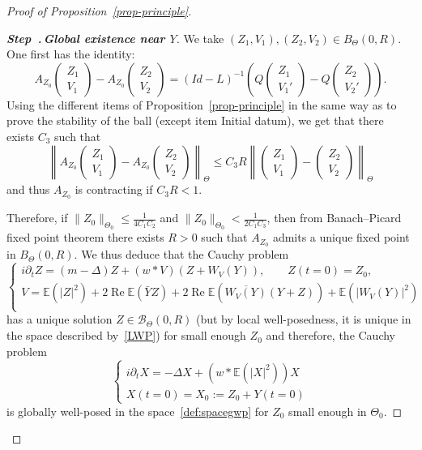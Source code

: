 \documentclass[AHL, Unicode, longabstracts,published]{cedram}
\newcommand{\E}{\mathbb{E}}
\DeclareMathOperator{\Rel}{Re}
\newcommand{\mclB}{\mathcal{B}}
\newcounter{stepcount}
\newenvironment{step}[1]{\refstepcounter{stepcount}\begin{proof}[{\bf{Step~\thestepcount}{.\,\emph{#1}}}]}{\let\qed\relax\end{proof}}
\begin{document}
\begin{proof}[Proof of Proposition~\ref{prop-principle}]
\begin{step}{{Global existence near $Y$}}
We take $(Z_1,V_1),(Z_2,V_2)\in B_\Theta(0,R)$. One first has the identity:
\begin{equation} \label{id:AV1-V2inter}
A_{Z_0}
\begin{pmatrix}
Z_1\\ V_1
\end{pmatrix} - A_{Z_0}
\begin{pmatrix}
Z_2\\ V_2
\end{pmatrix} = (Id-L)^{-1} \left(Q
\begin{pmatrix}
Z_1\\ V_1'
\end{pmatrix} - Q
\begin{pmatrix}
Z_2\\ V_2'
\end{pmatrix} \right).
\end{equation} Using the different items of Proposition~\ref{prop-principle} in the same way as to prove the stability of the ball (except item Initial datum), we get that there exists $C_3$ such that
\[
\left \| A_{Z_0}
\begin{pmatrix} Z_1\\V_1
\end{pmatrix} - A_{Z_0}
\begin{pmatrix} Z_2\\V_2
\end{pmatrix} \right\|_{\Theta} \leq C_{3} R \left\|
\begin{pmatrix} Z_1\\V_1
\end{pmatrix} -
\begin{pmatrix} Z_2\\V_2
\end{pmatrix} \right\|_{\Theta}
\]
and thus $A_{Z_0}$ is contracting if $C_{3}R <1$.
\vspace{4pt}


Therefore, if $\|Z_0\|_{\Theta_0} \leq \frac1{4C_1C_2} $ and $\|Z_0\|_{\Theta_0} < \frac1{2C_1C_{3}}$, then from Banach--Picard fixed point theorem there exists $R>0$ such that $A_{Z_0}$ admits a unique fixed point in $B_{\Theta}(0,R)$. We thus deduce that the Cauchy problem
\[
\begin{cases}
i\partial_t Z = (m-\Delta) Z + (w*V) (Z+W_V(Y)),\quad \quad Z (t=0) = Z_0, \\
V = \E\left(|Z|^2\right) + 2\Rel\E (\bar Y Z) + 2\Rel\E \left(\overline{ W_V(Y)}(Y+ Z)\right) + \E\left(|W_V(Y)|^2\right)\\
\end{cases}
\]
has a unique solution $Z \in \mclB_{\Theta}(0,R)$ (but by local well-posedness, it is unique in the space described by~\eqref{LWP}) for small enough $Z_0$ and therefore, the Cauchy problem
\[
\begin{cases}
i\partial_t X = -\Delta X + \left(w*\E\left(|X|^2\right)\right)X \\
X(t=0) = X_0 := Z_0 + Y(t=0)
\end{cases}
\]
is globally well-posed in the space~\eqref{def:spacegwp} for $Z_0$ small enough in $\Theta_0$.
\end{step}


\end{proof}
\end{document}
